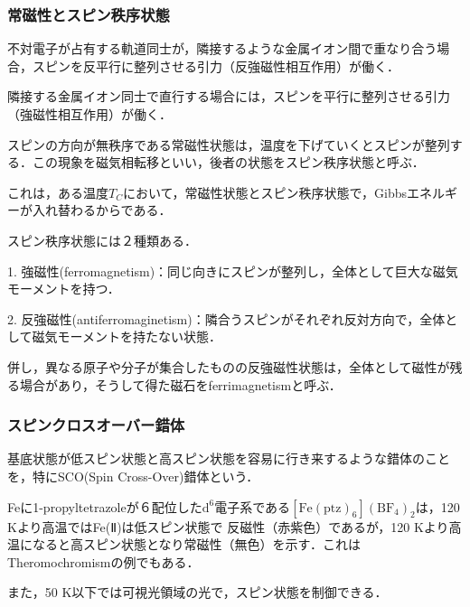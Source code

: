 \documentclass[uplatex, dvipdfmx]{jsreport}
\begin{document}
\subsubsection{常磁性とスピン秩序状態}

\begin{theory}
    不対電子が占有する軌道同士が，隣接するような金属イオン間で重なり合う場合，スピンを反平行に整列させる引力（反強磁性相互作用）が働く．

    隣接する金属イオン同士で直行する場合には，スピンを平行に整列させる引力（強磁性相互作用）が働く．
\end{theory}

\begin{fact}[スピン秩序状態]
    スピンの方向が無秩序である常磁性状態は，温度を下げていくとスピンが整列する．この現象を磁気相転移といい，後者の状態をスピン秩序状態と呼ぶ．

    これは，ある温度$T_C$において，常磁性状態とスピン秩序状態で，Gibbsエネルギーが入れ替わるからである．

    スピン秩序状態には２種類ある．

    1. 強磁性(ferromagnetism)：同じ向きにスピンが整列し，全体として巨大な磁気モーメントを持つ．

    2. 反強磁性(antiferromaginetism)：隣合うスピンがそれぞれ反対方向で，全体として磁気モーメントを持たない状態．

    併し，異なる原子や分子が集合したものの反強磁性状態は，全体として磁性が残る場合があり，そうして得た磁石をferrimagnetismと呼ぶ．
\end{fact}

\subsubsection{スピンクロスオーバー錯体}

\begin{definition}
    基底状態が低スピン状態と高スピン状態を容易に行き来するような錯体のことを，特にSCO(Spin Cross-Over)錯体という．
\end{definition}
\begin{example}
    Feに1-propyltetrazoleが６配位した$\mathrm{d}^6$電子系である$\mathrm{[Fe(ptz)_6](BF_4)_2}$は，120 Kより高温ではFe(Ⅱ)は低スピン状態で
    反磁性（赤紫色）であるが，120 Kより高温になると高スピン状態となり常磁性（無色）を示す．これはTheromochromismの例でもある．

    また，50 K以下では可視光領域の光で，スピン状態を制御できる．
\end{example}
\end{document}
